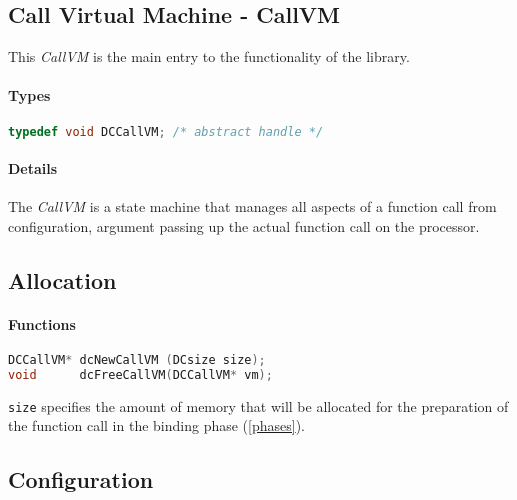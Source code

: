\pagebreak

\subsection{Call Virtual Machine - CallVM}

This \emph{CallVM} is the main entry to the functionality of the library.

\paragraph{Types}

\begin{lstlisting}[language=c]
typedef void DCCallVM; /* abstract handle */
\end{lstlisting}

\paragraph{Details}
The \emph{CallVM} is a state machine that manages all aspects of a function 
call from configuration, argument passing up the actual function call on
the processor.

\subsection{Allocation}

\paragraph{Functions}

\begin{lstlisting}[language=c]
DCCallVM* dcNewCallVM (DCsize size);
void      dcFreeCallVM(DCCallVM* vm);
\end{lstlisting}

\lstinline{size} specifies the amount of memory that will be allocated for
the preparation of the function call in the binding phase (\ref{phases}).


\subsection{Configuration}

